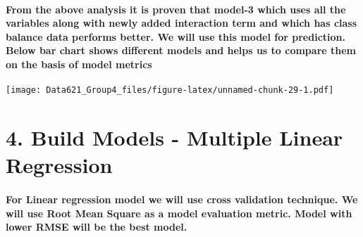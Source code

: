 \documentclass[]{article}
\let\oldparagraph\paragraph
\renewcommand{\paragraph}[1]{\oldparagraph{#1}\mbox{}}
\begin{document}
\hypertarget{from-the-above-analysis-it-is-proven-that-model-3-which-uses-all-the-variables-along-with-newly-added-interaction-term-and-which-has-class-balance-data-performs-better.-we-will-use-this-model-for-prediction.-below-bar-chart-shows-different-models-and-helps-us-to-compare-them-on-the-basis-of-model-metrics}{%
\paragraph{\texorpdfstring{\textbf{From the above analysis it is proven
that model-3 which uses all the variables along with newly added
interaction term and which has class balance data performs better. We
will use this model for prediction. Below bar chart shows different
models and helps us to compare them on the basis of model
metrics}}{From the above analysis it is proven that model-3 which uses all the variables along with newly added interaction term and which has class balance data performs better. We will use this model for prediction. Below bar chart shows different models and helps us to compare them on the basis of model metrics}}\label{from-the-above-analysis-it-is-proven-that-model-3-which-uses-all-the-variables-along-with-newly-added-interaction-term-and-which-has-class-balance-data-performs-better.-we-will-use-this-model-for-prediction.-below-bar-chart-shows-different-models-and-helps-us-to-compare-them-on-the-basis-of-model-metrics}}

\texttt{[image: Data621\_Group4\_files/figure-latex/unnamed-chunk-29-1.pdf]}

\hypertarget{build-models---multiple-linear-regression}{%
\section{4. Build Models - Multiple Linear
Regression}\label{build-models---multiple-linear-regression}}

\hypertarget{for-linear-regression-model-we-will-use-cross-validation-technique.-we-will-use-root-mean-square-as-a-model-evaluation-metric.-model-with-lower-rmse-will-be-the-best-model.}{%
\paragraph{For Linear regression model we will use cross validation
technique. We will use Root Mean Square as a model evaluation metric.
Model with lower RMSE will be the best
model.}\label{for-linear-regression-model-we-will-use-cross-validation-technique.-we-will-use-root-mean-square-as-a-model-evaluation-metric.-model-with-lower-rmse-will-be-the-best-model.}}
\end{document}
